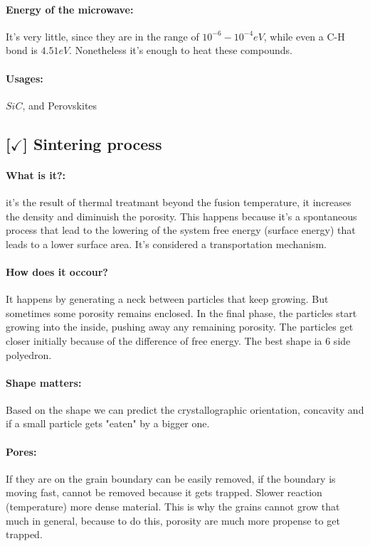 \paragraph{Energy of the microwave:} It's very little, since they are in the range of $10^{-6} - 10^{-4} eV$, while even a C-H bond is $4.51 eV$. Nonetheless it's enough to heat these compounds.

\paragraph{Usages:} $SiC$, and Perovskites

\subsection{[$\checkmark$] Sintering process}

\paragraph{What is it?:} it's the result of thermal treatmant beyond the fusion temperature, it increases the density and diminuish the porosity. This happens because it's a spontaneous process that lead to the lowering of the system free energy (surface energy) that leads to a lower surface area. It's considered a transportation mechanism.

\paragraph{How does it occour?} It happens by generating a neck between particles that keep growing. But sometimes some porosity remains enclosed. In the final phase, the particles start growing into the inside, pushing away any remaining porosity. The particles get closer initially because of the difference of free energy. The best shape ia 6 side polyedron.

\paragraph{Shape matters:} Based on the shape we can predict the crystallographic orientation, concavity and if a small particle gets "eaten" by a bigger one.

\paragraph{Pores:} If they are on the grain boundary can be easily removed, if the boundary is moving fast, cannot be removed because it gets trapped. Slower reaction (temperature) more dense material. This is why the grains cannot grow that much in general, because to do this, porosity are much more propense to get trapped.

